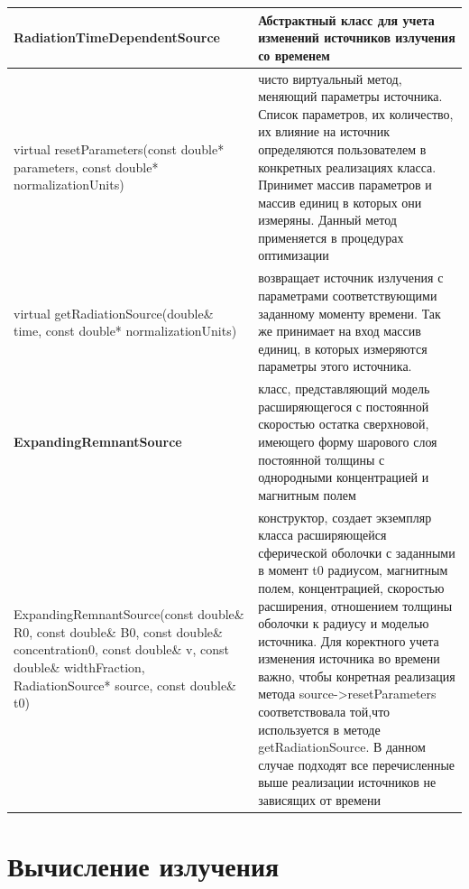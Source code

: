 \begin{small}
	\label{sourceTimeDependentMethods1}
	\begin{xtabular}{|p{0.5\textwidth}|p{0.5\textwidth}|}
		\hline
		\textbf{RadiationTimeDependentSource} & Абстрактный класс для учета изменений источников излучения со временем\\
		\hline
		virtual resetParameters(const double* parameters, const double* normalizationUnits) & чисто виртуальный метод, меняющий параметры источника. Список параметров, их количество, их влияние на источник определяются пользователем в конкретных реализациях класса. Принимет массив параметров и массив единиц в которых они измеряны. Данный метод применяется в процедурах оптимизации\\
		\hline
		virtual getRadiationSource(double\& time, const double* normalizationUnits) & возвращает источник излучения с параметрами соответствующими заданному моменту времени. Так же принимает на вход массив единиц, в которых измеряются параметры этого источника.\\
		\hline
		\textbf{ExpandingRemnantSource} & класс, представляющий модель расширяющегося с постоянной скоростью остатка сверхновой, имеющего форму шарового слоя постоянной толщины с однородными концентрацией и магнитным полем \\
		\hline
		ExpandingRemnantSource(const double\& R0, const double\& B0, const double\& concentration0, const double\& v, const double\& widthFraction, RadiationSource* source, const double\& t0) & конструктор, создает экземпляр класса расширяющейся сферической оболочки с заданными в момент t0 радиусом, магнитным полем, концентрацией, скоростью расширения, отношением толщины оболочки к радиусу и моделью источника. Для коректного учета изменения источника во времени важно, чтобы конретная реализация метода source->resetParameters соответствовала той,что используется в методе getRadiationSource. В данном случае подходят все перечисленные выше реализации источников не зависящих от времени\\
		\hline
	\end{xtabular}
\end{small}

\section{Вычисление излучения}

